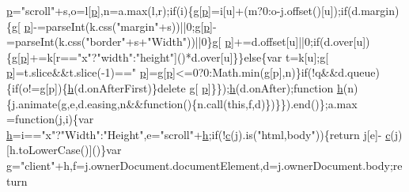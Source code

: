 \begin{DoxyCode}
      \hyperlink{jquery_8js_a2335e57f79b6acfb6de59c235dc8a83e}{p}=\textcolor{stringliteral}{"scroll"}+s,o=l[\hyperlink{jquery_8js_a2335e57f79b6acfb6de59c235dc8a83e}{p}],n=a.max(l,r);\textcolor{keywordflow}{if}(i)\{g[\hyperlink{jquery_8js_a2335e57f79b6acfb6de59c235dc8a83e}{p}]=i[u]+(m?0:o-j.offset()[u]);\textcolor{keywordflow}{if}(d.margin)\{g[
      \hyperlink{jquery_8js_a2335e57f79b6acfb6de59c235dc8a83e}{p}]-=parseInt(k.css(\textcolor{stringliteral}{"margin"}+s))||0;g[\hyperlink{jquery_8js_a2335e57f79b6acfb6de59c235dc8a83e}{p}]-=parseInt(k.css(\textcolor{stringliteral}{"border"}+s+\textcolor{stringliteral}{"Width"}))||0\}g[
      \hyperlink{jquery_8js_a2335e57f79b6acfb6de59c235dc8a83e}{p}]+=d.offset[u]||0;\textcolor{keywordflow}{if}(d.over[u])\{g[\hyperlink{jquery_8js_a2335e57f79b6acfb6de59c235dc8a83e}{p}]+=k[r==\textcolor{stringliteral}{"x"}?\textcolor{stringliteral}{"width"}:\textcolor{stringliteral}{"height"}]()*d.over[u]\}\}\textcolor{keywordflow}{else}\{var t=k[u];g[
      \hyperlink{jquery_8js_a2335e57f79b6acfb6de59c235dc8a83e}{p}]=t.slice&&t.slice(-1)==\textcolor{stringliteral}{"%
      \hyperlink{jquery_8js_a2335e57f79b6acfb6de59c235dc8a83e}{p}]=g[\hyperlink{jquery_8js_a2335e57f79b6acfb6de59c235dc8a83e}{p}]<=0?0:Math.min(g[p],n)\}\textcolor{keywordflow}{if}(!q&&d.queue)\{\textcolor{keywordflow}{if}(o!=g[p])\{\hyperlink{all__1a_8js_aebecdaf2444e2be39f4804412d6a3bf8}{h}(d.onAfterFirst)\}\textcolor{keyword}{delete} g[
      \hyperlink{jquery_8js_a2335e57f79b6acfb6de59c235dc8a83e}{p}]\}\});\hyperlink{all__1a_8js_aebecdaf2444e2be39f4804412d6a3bf8}{h}(d.onAfter);\textcolor{keyword}{function} \hyperlink{all__1a_8js_aebecdaf2444e2be39f4804412d6a3bf8}{h}(n)\{j.animate(g,e,d.easing,n&&\textcolor{keyword}{function}()\{n.call(this,f,d)\})\}\}).end()\};a.max
      =\textcolor{keyword}{function}(j,i)\{var \hyperlink{all__1a_8js_aebecdaf2444e2be39f4804412d6a3bf8}{h}=i==\textcolor{stringliteral}{"x"}?\textcolor{stringliteral}{"Width"}:\textcolor{stringliteral}{"Height"},e=\textcolor{stringliteral}{"scroll"}+\hyperlink{all__1a_8js_aebecdaf2444e2be39f4804412d6a3bf8}{h};\textcolor{keywordflow}{if}(!\hyperlink{jquery_8js_ad171626e81625b5e9f5cb177a3a8fb1c}{c}(j).is(\textcolor{stringliteral}{"html,body"}))\{\textcolor{keywordflow}{return} j[e]-
      \hyperlink{jquery_8js_ad171626e81625b5e9f5cb177a3a8fb1c}{c}(j)[h.toLowerCase()]()\}var g=\textcolor{stringliteral}{"client"}+h,f=j.ownerDocument.documentElement,d=j.ownerDocument.body;\textcolor{keywordflow}{return} 
}
\end{DoxyCode}
